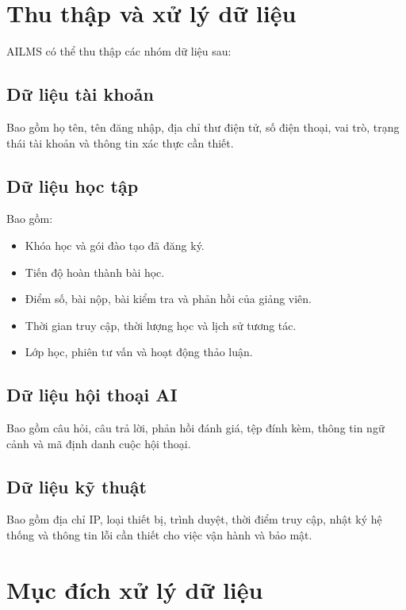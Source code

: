 \documentclass[12pt,a4paper]{article}
\begin{document}
\section{Thu thập và xử lý dữ liệu}

AILMS có thể thu thập các nhóm dữ liệu sau:

\subsection{Dữ liệu tài khoản}

Bao gồm họ tên, tên đăng nhập, địa chỉ thư điện tử, số điện thoại,
vai trò, trạng thái tài khoản và thông tin xác thực cần thiết.

\subsection{Dữ liệu học tập}

Bao gồm:

\begin{itemize}
    \item Khóa học và gói đào tạo đã đăng ký.
    \item Tiến độ hoàn thành bài học.
    \item Điểm số, bài nộp, bài kiểm tra và phản hồi của giảng viên.
    \item Thời gian truy cập, thời lượng học và lịch sử tương tác.
    \item Lớp học, phiên tư vấn và hoạt động thảo luận.
\end{itemize}

\subsection{Dữ liệu hội thoại AI}

Bao gồm câu hỏi, câu trả lời, phản hồi đánh giá, tệp đính kèm,
thông tin ngữ cảnh và mã định danh cuộc hội thoại.

\subsection{Dữ liệu kỹ thuật}

Bao gồm địa chỉ IP, loại thiết bị, trình duyệt, thời điểm truy cập,
nhật ký hệ thống và thông tin lỗi cần thiết cho việc vận hành và bảo mật.

\section{Mục đích xử lý dữ liệu}
\end{document}
